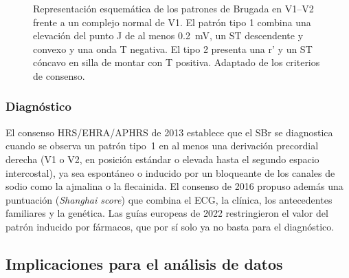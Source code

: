 \begin{figure}[H]
\caption[Patrones de Brugada en V1--V2]{Representación esquemática de los patrones de Brugada en V1--V2 frente a un complejo normal de V1. El patrón tipo 1 combina una elevación del punto J de al menos \SI{0.2}{\milli\volt}, un ST descendente y convexo y una onda T negativa. El tipo 2 presenta una r' y un ST cóncavo en silla de montar con T positiva. Adaptado de los criterios de consenso.}
\label{fig:patrones}
\end{figure}

\subsubsection{Diagnóstico}

El consenso HRS/EHRA/APHRS de 2013 establece que el SBr se diagnostica cuando se observa un patrón tipo~1 en al menos una derivación precordial derecha (V1 o V2, en posición estándar o elevada hasta el segundo espacio intercostal), ya sea espontáneo o inducido por un bloqueante de los canales de sodio como la ajmalina o la flecainida. El consenso de 2016 propuso además una puntuación (\emph{Shanghai score}) que combina el ECG, la clínica, los antecedentes familiares y la genética. Las guías europeas de 2022 restringieron el valor del patrón inducido por fármacos, que por sí solo ya no basta para el diagnóstico.

\subsection{Implicaciones para el análisis de datos}

